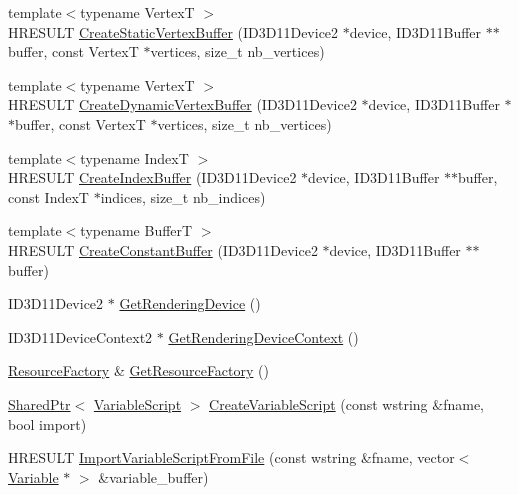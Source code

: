 \begin{DoxyCompactItemize}
\item 
{\footnotesize template$<$typename VertexT $>$ }\\H\+R\+E\+S\+U\+LT \hyperlink{namespacemage_a7cf0754e3bc2681bc1990e64f4155032}{Create\+Static\+Vertex\+Buffer} (I\+D3\+D11\+Device2 $\ast$device, I\+D3\+D11\+Buffer $\ast$$\ast$buffer, const VertexT $\ast$vertices, size\+\_\+t nb\+\_\+vertices)
\item 
{\footnotesize template$<$typename VertexT $>$ }\\H\+R\+E\+S\+U\+LT \hyperlink{namespacemage_aeb9bab1a9d739e3908c90db3832d9053}{Create\+Dynamic\+Vertex\+Buffer} (I\+D3\+D11\+Device2 $\ast$device, I\+D3\+D11\+Buffer $\ast$$\ast$buffer, const VertexT $\ast$vertices, size\+\_\+t nb\+\_\+vertices)
\item 
{\footnotesize template$<$typename IndexT $>$ }\\H\+R\+E\+S\+U\+LT \hyperlink{namespacemage_a5a60c12d0fd0ca0e852cf3b0156c9513}{Create\+Index\+Buffer} (I\+D3\+D11\+Device2 $\ast$device, I\+D3\+D11\+Buffer $\ast$$\ast$buffer, const IndexT $\ast$indices, size\+\_\+t nb\+\_\+indices)
\item 
{\footnotesize template$<$typename BufferT $>$ }\\H\+R\+E\+S\+U\+LT \hyperlink{namespacemage_ac008dfd1f142382a04c5e3fd3a3e062e}{Create\+Constant\+Buffer} (I\+D3\+D11\+Device2 $\ast$device, I\+D3\+D11\+Buffer $\ast$$\ast$buffer)
\item 
I\+D3\+D11\+Device2 $\ast$ \hyperlink{namespacemage_a30c7feb10b2be75bbce6d9c3739899c6}{Get\+Rendering\+Device} ()
\item 
I\+D3\+D11\+Device\+Context2 $\ast$ \hyperlink{namespacemage_a55d3eaa7476e19ec8969e27d69249d95}{Get\+Rendering\+Device\+Context} ()
\item 
\hyperlink{classmage_1_1_resource_factory}{Resource\+Factory} \& \hyperlink{namespacemage_ad773a6b6442b973421222b664229e86d}{Get\+Resource\+Factory} ()
\item 
\hyperlink{namespacemage_a1e01ae66713838a7a67d30e44c67703e}{Shared\+Ptr}$<$ \hyperlink{classmage_1_1_variable_script}{Variable\+Script} $>$ \hyperlink{namespacemage_a4ee2d46e5220246892bb34b7d1e97fbe}{Create\+Variable\+Script} (const wstring \&fname, bool import)
\item 
H\+R\+E\+S\+U\+LT \hyperlink{namespacemage_a6515a0a04b54bd9544eefe5a23ab8c43}{Import\+Variable\+Script\+From\+File} (const wstring \&fname, vector$<$ \hyperlink{structmage_1_1_variable}{Variable} $\ast$ $>$ \&variable\+\_\+buffer)
\item 

\end{DoxyCompactItemize}
